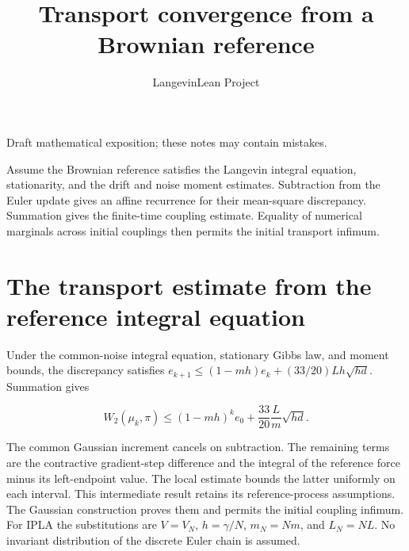\documentclass[11pt,a4paper]{article}
\title{\texorpdfstring{Transport convergence from a Brownian reference}{Transport convergence from a Brownian reference}}
\author{LangevinLean Project}
\date{}
\begin{document}
\maketitle
Draft mathematical exposition; these notes may contain mistakes.


Assume the Brownian reference satisfies the Langevin integral equation, stationarity, and the drift and noise moment estimates. Subtraction from the Euler update gives an affine recurrence for their mean-square discrepancy. Summation gives the finite-time coupling estimate. Equality of numerical marginals across initial couplings then permits the initial transport infimum.



\section{\texorpdfstring{The transport estimate from the reference integral equation}{The transport estimate from the reference integral equation}}


Under the common-noise integral equation, stationary Gibbs law, and moment bounds, the discrepancy satisfies \(e_{k+1}\le(1-mh)e_k+(33/20)Lh\sqrt{hd}\). Summation gives

\[W_2(\mu_k,\pi)\le(1-mh)^ke_0+\frac{33}{20}\frac Lm\sqrt{hd}.\]

The common Gaussian increment cancels on subtraction. The remaining terms are the contractive gradient-step difference and the integral of the reference force minus its left-endpoint value. The local estimate bounds the latter uniformly on each interval. This intermediate result retains its reference-process assumptions. The Gaussian construction proves them and permits the initial coupling infimum. For IPLA the substitutions are \(V=V_N\), \(h=\gamma/N\), \(m_N=Nm\), and \(L_N=NL\). No invariant distribution of the discrete Euler chain is assumed.
\end{document}
